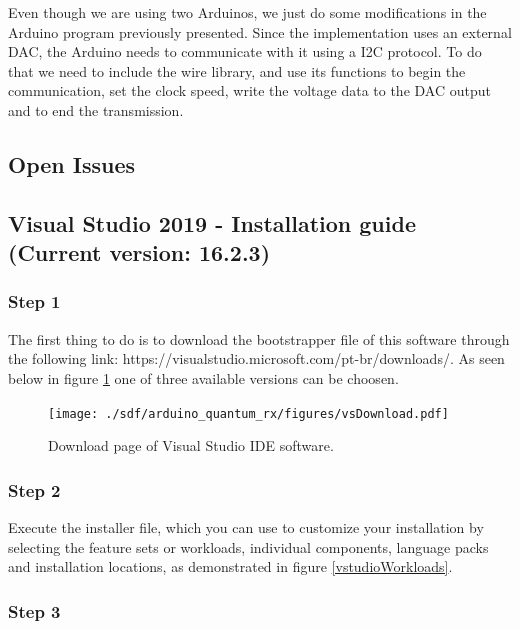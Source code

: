 \begin{refsection}
\begin{figure}[H]
	\end{figure}

	Even though we are using two Arduinos, we just do some modifications in the Arduino program previously presented. Since the implementation uses an external DAC, the Arduino needs to communicate with it using a I2C protocol. To do that we need to include the wire library, and use its functions to begin the communication, set the clock speed, write the voltage data to the DAC output and to end the transmission. 
	
	
	\subsection{Open Issues}
	
	\clearpage
	\subsection{Visual Studio 2019 - Installation guide (Current version: 16.2.3)}
	
	\subsubsection{Step 1}
	
	The first thing to do is to download the bootstrapper file of this software through the following link: https://visualstudio.microsoft.com/pt-br/downloads/. As seen below in figure \ref{vstudio} one of three available versions can be choosen.
	
	\begin{figure}[H]
		\centering
		\texttt{[image: ./sdf/arduino\_quantum\_rx/figures/vsDownload.pdf]}
		\caption{Download page of Visual Studio IDE software.}
		\label{vstudio}
	\end{figure}
	
	
	\subsubsection{Step 2}
	
	Execute the installer file, which you can use to customize your installation by selecting the feature sets or workloads, individual components, language packs and installation locations, as demonstrated in figure \ref{vstudioWorkloads}.
	
	
	
	\subsubsection{Step 3}
	

\end{refsection}
